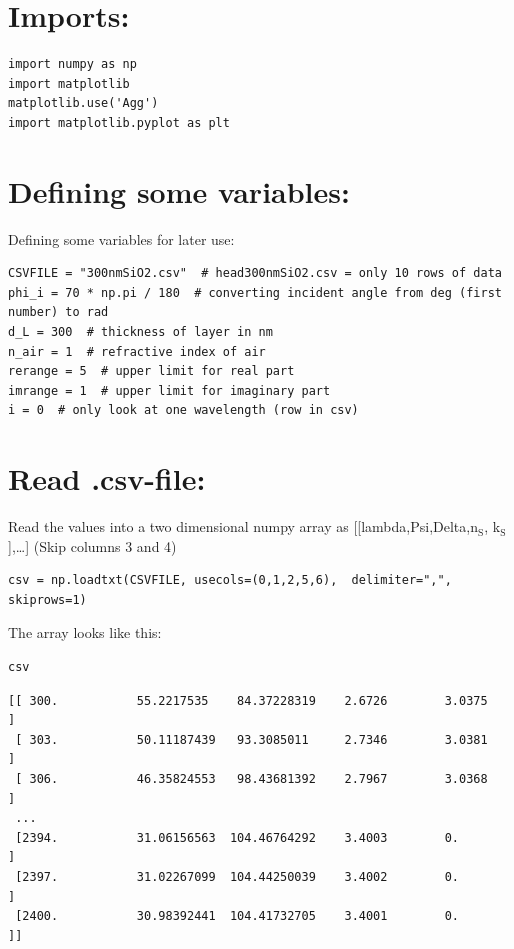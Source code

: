 \documentclass[11pt]{article}
\begin{document}
\section{Imports:}
\label{sec:org3663f70}
\begin{verbatim}
import numpy as np
import matplotlib
matplotlib.use('Agg')
import matplotlib.pyplot as plt
\end{verbatim}

\section{Defining some variables:}
\label{sec:org12f2044}
Defining some variables for later use:

\begin{verbatim}
CSVFILE = "300nmSiO2.csv"  # head300nmSiO2.csv = only 10 rows of data
phi_i = 70 * np.pi / 180  # converting incident angle from deg (first number) to rad
d_L = 300  # thickness of layer in nm
n_air = 1  # refractive index of air
rerange = 5  # upper limit for real part
imrange = 1  # upper limit for imaginary part
i = 0  # only look at one wavelength (row in csv)
\end{verbatim}

\section{Read .csv-file:}
\label{sec:org1a49448}
Read the values into a two dimensional numpy array as [[lambda,Psi,Delta,n\(_{\text{S}}\), k\(_{\text{S}}\)],\ldots{}] (Skip columns 3 and 4)

\begin{verbatim}
csv = np.loadtxt(CSVFILE, usecols=(0,1,2,5,6),  delimiter=",", skiprows=1)
\end{verbatim}

The array looks like this:
\begin{verbatim}
csv
\end{verbatim}

\begin{verbatim}
[[ 300.           55.2217535    84.37228319    2.6726        3.0375    ]
 [ 303.           50.11187439   93.3085011     2.7346        3.0381    ]
 [ 306.           46.35824553   98.43681392    2.7967        3.0368    ]
 ...
 [2394.           31.06156563  104.46764292    3.4003        0.        ]
 [2397.           31.02267099  104.44250039    3.4002        0.        ]
 [2400.           30.98392441  104.41732705    3.4001        0.        ]]
\end{verbatim}
\end{document}
